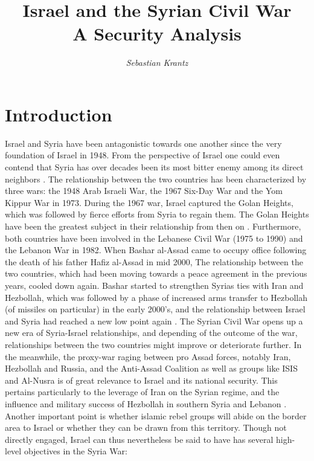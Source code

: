 \documentclass[a4paper]{article}\twocolumn
\title{\textbf{Israel and the Syrian Civil War}\\A Security Analysis}
\author{\textit{Sebastian Krantz}}
\begin{document}
\maketitle


\section{Introduction}
Israel and Syria have been antagonistic towards one another since the very foundation of Israel in 1948. From the perspective of Israel one could even contend that Syria has over decades been its most bitter \hspace{1.4mm} enemy \hspace{1.4mm}  among \hspace{1.4mm} its \hspace{1.4mm} direct \hspace{1.4mm} neighbors \newline \cite{Rabinovich2012}. The relationship between the two countries has been characterized by three wars: the 1948 Arab Israeli War, the 1967 Six-Day War and the Yom Kippur War in 1973. During the 1967 war, Israel captured the Golan Heights, which was followed by fierce efforts from Syria to regain them. The Golan Heights have been the greatest subject in their relationship from then on \cite{Rabinovich2012}. Furthermore, both countries have been involved in the Lebanese Civil War (1975 to 1990) and the Lebanon War in 1982. When Bashar al-Assad came to occupy office following the death of his father Hafiz al-Assad in mid 2000, The relationship between the two countries, which had been moving towards a peace agreement in the previous years, cooled down again. Bashar started to strengthen Syrias ties with Iran and Hezbollah, which was followed by a phase of increased arms transfer to Hezbollah (of missiles on particular) in the early 2000's, and the relationship between Israel and Syria had reached a new low point again \cite{Rabinovich2012}. 
The Syrian Civil War opens up a new era of Syria-Israel relationships, and depending of the outcome of the war, relationships between the two countries might improve or deteriorate further. In the meanwhile, the proxy-war raging between pro Assad forces, notably Iran, Hezbollah and Russia, and the Anti-Assad Coalition  as well as groups like ISIS and Al-Nusra is of great relevance to Israel and its national security. This pertains particularly to the leverage of Iran on the Syrian regime, and the influence and military success of Hezbollah in southern Syria and Lebanon \cite{Hanauer2015}. Another important point is whether islamic rebel groups will abide on the border area to Israel or whether they can be drawn from this territory. Though not directly engaged, Israel can thus nevertheless be said to have has several high-level objectives in the Syria War:
\end{document}
